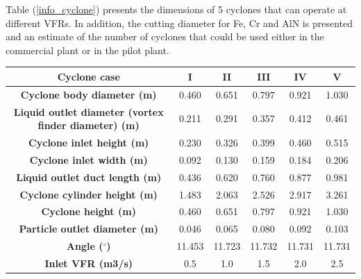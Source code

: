 Table (\ref{info_cyclone}) presents the dimensions of 5 cyclones that can operate at different VFRs. In addition, the cutting diameter for Fe, Cr and AlN is presented and an estimate of the number of cyclones that could be used either in the commercial plant or in the pilot plant.
\begin{table}[H]
	\begin{tabular}{cccccc}
		\rule[-0.3cm]{0pt}{0.8cm}\textbf{Cyclone   case}                                        & \textbf{I} & \textbf{II} & \textbf{III} & \textbf{IV} & \textbf{V} \\ \hline
		\rule[-0.3cm]{0pt}{0.8cm}\textbf{Cyclone body diameter (m)}                             & 0.460      & 0.651       & 0.797        & 0.921       & 1.030      \\\hline
		\rule[-0.3cm]{0pt}{0.8cm}\textbf{Liquid outlet diameter (vortex finder diameter) (m)} & 0.211      & 0.291       & 0.357        & 0.412       & 0.461      \\\hline
		\rule[-0.3cm]{0pt}{0.8cm}\textbf{Cyclone inlet height (m)}                               & 0.230      & 0.326       & 0.399        & 0.460       & 0.515      \\\hline
		\rule[-0.3cm]{0pt}{0.8cm}\textbf{Cyclone inlet width (m)}                          & 0.092      & 0.130       & 0.159        & 0.184       & 0.206      \\\hline
		\rule[-0.3cm]{0pt}{0.8cm}\textbf{Liquid outlet duct length (m)}                         & 0.436      & 0.620       & 0.760        & 0.877       & 0.981      \\\hline
		\rule[-0.3cm]{0pt}{0.8cm}\textbf{Cyclone cylinder height (m)}                           & 1.483      & 2.063       & 2.526        & 2.917       & 3.261      \\\hline
		\rule[-0.3cm]{0pt}{0.8cm}\textbf{Cyclone height (m)}                                    & 0.460      & 0.651       & 0.797        & 0.921       & 1.030      \\\hline
		\rule[-0.3cm]{0pt}{0.8cm}\textbf{Particle outlet diameter (m)}                          & 0.046      & 0.065       & 0.080        & 0.092       & 0.103      \\\hline
		\rule[-0.3cm]{0pt}{0.8cm}\textbf{Angle ($^{\circ}$)}                                                 & 11.453     & 11.723      & 11.732       & 11.731      & 11.731     \\\hline
		\rule[-0.3cm]{0pt}{0.8cm}\textbf{Inlet VFR (m3/s)}                                      & 0.5     & 1.0       & 1.5       & 2.0       & 2.5      \\\hline

\end{tabular}
\end{table}
